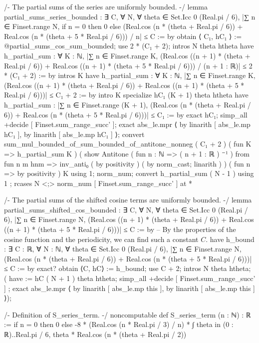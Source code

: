 /-
The partial sums of the series are uniformly bounded.
-/
lemma partial_sums_series_bounded :
  ∃ C, ∀ N, ∀ theta ∈ Set.Icc 0 (Real.pi / 6),
  |∑ n ∈ Finset.range N, if n = 0 then 0 else (Real.cos (n * (theta + Real.pi / 6)) + Real.cos (n * (theta + 5 * Real.pi / 6))) / n| ≤ C := by
    obtain ⟨ C₁, hC₁ ⟩ := @partial_sums_cos_sum_bounded;
    use 2 * (C₁ + 2);
    intros N theta htheta
    have h_partial_sum : ∀ K : ℕ, |∑ n ∈ Finset.range K, (Real.cos ((n + 1) * (theta + Real.pi / 6)) + Real.cos ((n + 1) * (theta + 5 * Real.pi / 6))) / (n + 1 : ℝ)| ≤ 2 * (C₁ + 2) := by
      intros K
      have h_partial_sum : ∀ K : ℕ, |∑ n ∈ Finset.range K, (Real.cos ((n + 1) * (theta + Real.pi / 6)) + Real.cos ((n + 1) * (theta + 5 * Real.pi / 6)))| ≤ C₁ + 2 := by
        intro K
        specialize hC₁ (K + 1) theta htheta
        have h_partial_sum : |∑ n ∈ Finset.range (K + 1), (Real.cos (n * (theta + Real.pi / 6)) + Real.cos (n * (theta + 5 * Real.pi / 6)))| ≤ C₁ := by
          exact hC₁;
        simp_all +decide [ Finset.sum_range_succ' ];
        exact abs_le.mpr ⟨ by linarith [ abs_le.mp hC₁ ], by linarith [ abs_le.mp hC₁ ] ⟩;
      convert sum_mul_bounded_of_sum_bounded_of_antitone_nonneg ( C₁ + 2 ) ( fun K => h_partial_sum K ) ( show Antitone ( fun n : ℕ => ( n + 1 : ℝ ) ⁻¹ ) from fun n m hnm => inv_anti₀ ( by positivity ) ( by norm_cast; linarith ) ) ( fun n => by positivity ) K using 1;
      norm_num;
    convert h_partial_sum ( N - 1 ) using 1 ; rcases N <;> norm_num [ Finset.sum_range_succ' ] at *

/-
The partial sums of the shifted cosine terms are uniformly bounded.
-/
lemma partial_sums_shifted_cos_bounded :
  ∃ C, ∀ N, ∀ theta ∈ Set.Icc 0 (Real.pi / 6),
  |∑ n ∈ Finset.range N, (Real.cos ((n + 1) * (theta + Real.pi / 6)) + Real.cos ((n + 1) * (theta + 5 * Real.pi / 6)))| ≤ C := by
    -- By the properties of the cosine function and the periodicity, we can find such a constant $C$.
    have h_bound : ∃ C : ℝ, ∀ N : ℕ, ∀ theta ∈ Set.Icc 0 (Real.pi / 6), |∑ n ∈ Finset.range N, (Real.cos (n * (theta + Real.pi / 6)) + Real.cos (n * (theta + 5 * Real.pi / 6)))| ≤ C := by
      exact?
    obtain ⟨C, hC⟩ := h_bound;
    use C + 2; intros N theta htheta; (
    have := hC ( N + 1 ) theta htheta; simp_all +decide [ Finset.sum_range_succ' ] ;
    exact abs_le.mpr ⟨ by linarith [ abs_le.mp this ], by linarith [ abs_le.mp this ] ⟩);

/-
Definition of S_series_term.
-/
noncomputable def S_series_term (n : ℕ) : ℝ :=
  if n = 0 then 0 else
  -8 * (Real.cos (n * Real.pi / 3) / n) * ∫ theta in (0 : ℝ)..Real.pi / 6, theta * Real.cos (n * (theta + Real.pi / 2))

